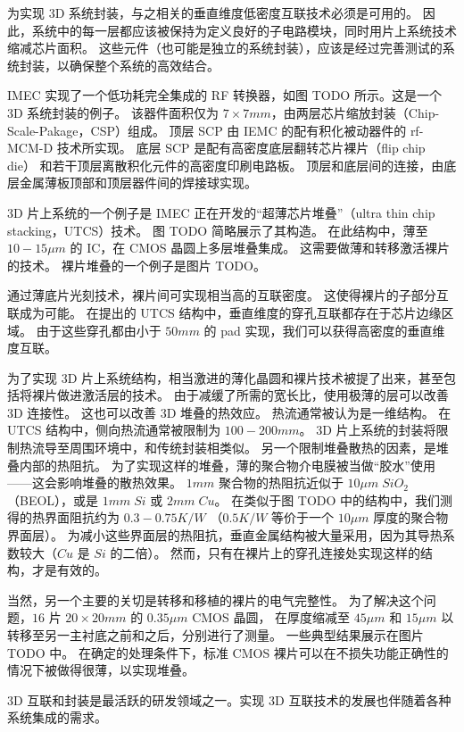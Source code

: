 为实现 3D 系统封装，与之相关的垂直维度低密度互联技术必须是可用的。
因此，系统中的每一层都应该被保持为定义良好的子电路模块，同时用片上系统技术缩减芯片面积。
这些元件（也可能是独立的系统封装），应该是经过完善测试的系统封装，以确保整个系统的高效结合。

IMEC 实现了一个低功耗完全集成的 RF 转换器，如图 TODO 所示。这是一个 3D 系统封装的例子。
该器件面积仅为 $7 \times 7 mm$，由两层芯片缩放封装（Chip-Scale-Pakage，CSP）组成。
顶层 SCP 由 IEMC 的配有积化被动器件的 rf-MCM-D 技术所实现。
底层 SCP 是配有高密度底层翻转芯片裸片（flip chip die） 和若干顶层离散积化元件的高密度印刷电路板。
顶层和底层间的连接，由底层金属薄板顶部和顶层器件间的焊接球实现。

3D 片上系统的一个例子是 IMEC 正在开发的“超薄芯片堆叠”（ultra thin chip stacking，UTCS）技术。
图 TODO 简略展示了其构造。
在此结构中，薄至 $10-15\mu m$ 的 IC，在 CMOS 晶圆上多层堆叠集成。
这需要做薄和转移激活裸片的技术。
裸片堆叠的一个例子是图片 TODO。

通过薄底片光刻技术，裸片间可实现相当高的互联密度。
这使得裸片的子部分互联成为可能。
在提出的 UTCS 结构中，垂直维度的穿孔互联都存在于芯片边缘区域。
由于这些穿孔都由小于 $50mm$ 的 pad 实现，我们可以获得高密度的垂直维度互联。

为了实现 3D 片上系统结构，相当激进的薄化晶圆和裸片技术被提了出来，甚至包括将裸片做进激活层的技术。
由于减缓了所需的宽长比，使用极薄的层可以改善 3D 连接性。
这也可以改善 3D 堆叠的热效应。
热流通常被认为是一维结构。
在 UTCS 结构中，侧向热流通常被限制为 $100-200 mm$。
3D 片上系统的封装将限制热流导至周围环境中，和传统封装相类似。
另一个限制堆叠散热的因素，是堆叠内部的热阻抗。
为了实现这样的堆叠，薄的聚合物介电膜被当做“胶水”使用——这会影响堆叠的散热效果。
$1mm$ 聚合物的热阻抗近似于 $10 \mu m \; SiO_2$（BEOL），或是 $1mm \; Si$ 或 $2mm \; Cu$。
在类似于图 TODO 中的结构中，我们测得的热界面阻抗约为 $0.3-0.75K/W$
（$0.5K/W$ 等价于一个 $10 \mu m$ 厚度的聚合物界面层）。
为减小这些界面层的热阻抗，垂直金属结构被大量采用，因为其导热系数较大（$Cu$ 是 $Si$ 的二倍）。
然而，只有在裸片上的穿孔连接处实现这样的结构，才是有效的。

当然，另一个主要的关切是转移和移植的裸片的电气完整性。
为了解决这个问题，$16$ 片 $20 \times 20 mm$ 的 $0.35 \mu m$ CMOS 晶圆，
在厚度缩减至 $45\mu m$ 和 $15 \mu m$ 以转移至另一主衬底之前和之后，分别进行了测量。
一些典型结果展示在图片 TODO 中。
在确定的处理条件下，标准 CMOS 裸片可以在不损失功能正确性的情况下被做得很薄，以实现堆叠。

3D 互联和封装是最活跃的研发领域之一。实现 3D 互联技术的发展也伴随着各种系统集成的需求。
